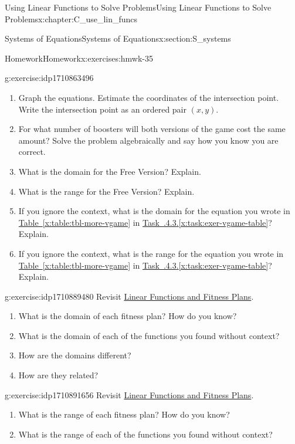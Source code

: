 \documentclass[oneside,10pt,]{book}
\newcommand{\xreffont}{\relax}
\numberwithin{equation}{chapter}
\begin{document}
\begin{chapterptx}{Using Linear Functions to Solve Problems}{}{Using Linear Functions to Solve Problems}{}{}{x:chapter:C_use_lin_funcs}
\begin{sectionptx}{Systems of Equations}{}{Systems of Equations}{}{}{x:section:S_systems}
\begin{exercises-subsection}{Homework}{}{Homework}{}{}{x:exercises:hmwk-35}
\begin{divisionexercise}{3}{}{}{g:exercise:idp1710863496}
\begin{enumerate}[font=\bfseries,label=(\alph*),ref=\alph*]
\item{}Graph the equations. Estimate the coordinates of the intersection point. Write the intersection point as an ordered pair \((x, y)\).%
\item{}For what number of boosters will both versions of the game cost the same amount? Solve the problem algebraically and say how you know you are correct.%
\item{}What is the domain for the Free Version? Explain.%
\item{}What is the range for the Free Version? Explain.%
\item{}If you ignore the context, what is the domain for the equation you wrote in \hyperref[x:table:tbl-more-vgame]{Table~{\xreffont\ref{x:table:tbl-more-vgame}}} in \hyperref[x:task:exer-vgame-table]{Task~{\xreffont 3.5.4.3}.{\xreffont\ref{x:task:exer-vgame-table}}}? Explain.%
\item{}If you ignore the context, what is the range for the equation you wrote in \hyperref[x:table:tbl-more-vgame]{Table~{\xreffont\ref{x:table:tbl-more-vgame}}} in \hyperref[x:task:exer-vgame-table]{Task~{\xreffont 3.5.4.3}.{\xreffont\ref{x:task:exer-vgame-table}}}? Explain.%
\end{enumerate}
\end{divisionexercise}%
\begin{divisionexercise}{4}{}{}{g:exercise:idp1710889480}%
Revisit \hyperref[x:worksheet:act-fitness]{Linear Functions and Fitness Plans}.%
\begin{enumerate}[font=\bfseries,label=(\alph*),ref=\alph*]
\item{}What is the domain of each fitness plan? How do you know?%
\item{}What is the domain of each of the functions you found without context?%
\item{}How are the domains different?%
\item{}How are they related?%
\end{enumerate}
\end{divisionexercise}%
\begin{divisionexercise}{5}{}{}{g:exercise:idp1710891656}%
Revisit \hyperref[x:worksheet:act-fitness]{Linear Functions and Fitness Plans}.%
\begin{enumerate}[font=\bfseries,label=(\alph*),ref=\alph*]
\item{}What is the range of each fitness plan? How do you know?%
\item{}What is the range of each of the functions you found without context?%

\end{enumerate}
\end{divisionexercise}
\end{exercises-subsection}
\end{sectionptx}
\end{chapterptx}
\end{document}

